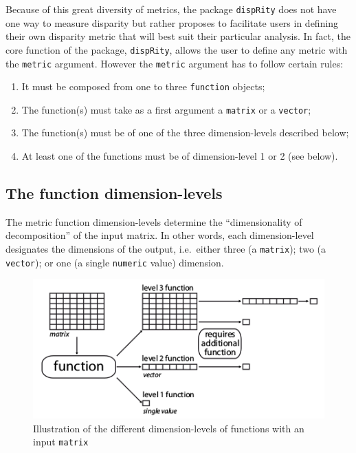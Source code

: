 \documentclass[]{book}
\providecommand{\tightlist}{%
  \setlength{\itemsep}{0pt}\setlength{\parskip}{0pt}}
\theoremstyle{definition}
\theoremstyle{definition}
\theoremstyle{remark}
\begin{document}
Because of this great diversity of metrics, the package
\texttt{dispRity} does not have one way to measure disparity but rather
proposes to facilitate users in defining their own disparity metric that
will best suit their particular analysis. In fact, the core function of
the package, \texttt{dispRity}, allows the user to define any metric
with the \texttt{metric} argument. However the \texttt{metric} argument
has to follow certain rules:

\begin{enumerate}
\def\labelenumi{\arabic{enumi}.}
\tightlist
\item
  It must be composed from one to three \texttt{function} objects;
\item
  The function(s) must take as a first argument a \texttt{matrix} or a
  \texttt{vector};
\item
  The function(s) must be of one of the three dimension-levels described
  below;
\item
  At least one of the functions must be of dimension-level 1 or 2 (see
  below).
\end{enumerate}

\subsection{The function
dimension-levels}\label{the-function-dimension-levels}

The metric function dimension-levels determine the ``dimensionality of
decomposition'' of the input matrix. In other words, each
dimension-level designates the dimensions of the output, i.e.~either
three (a \texttt{matrix}); two (a \texttt{vector}); or one (a single
\texttt{numeric} value) dimension.

\begin{figure}
\centering
\includegraphics{dispRity_fun.png}
\caption{Illustration of the different dimension-levels of functions
with an input \texttt{matrix}}
\end{figure}
\end{document}

